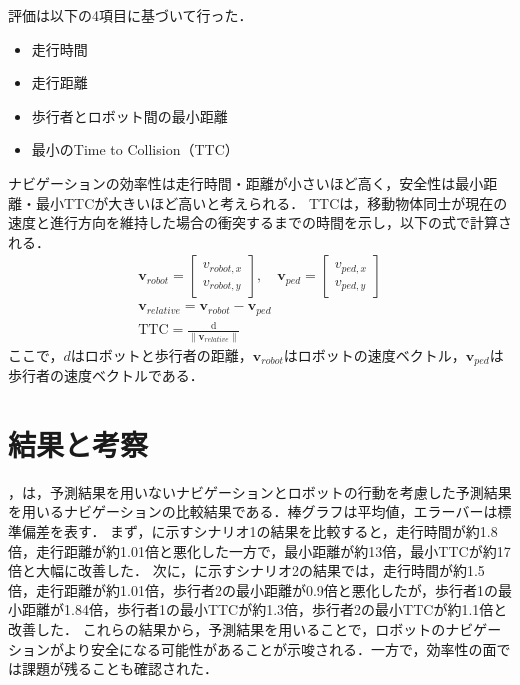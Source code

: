 評価は以下の4項目に基づいて行った．
\begin{itemize}
  \item 走行時間
  \item 走行距離
  \item 歩行者とロボット間の最小距離
  \item 最小のTime to Collision（TTC）
\end{itemize}
ナビゲーションの効率性は走行時間・距離が小さいほど高く，安全性は最小距離・最小TTCが大きいほど高いと考えられる．
TTCは，移動物体同士が現在の速度と進行方向を維持した場合の衝突するまでの時間を示し，以下の式で計算される．
\setlength{\jot}{1em}
\begin{align}
  \mathbf{v}_{robot} = \begin{bmatrix} v_{robot,x} \\ v_{robot,y} \end{bmatrix}, \quad 
  \mathbf{v}_{ped} = \begin{bmatrix} v_{ped,x} \\ v_{ped,y} \end{bmatrix} \\
  \mathbf{v}_{relative} = \mathbf{v}_{robot} - \mathbf{v}_{ped} \\
  \text{TTC} = \frac{\text{d}}{\|\mathbf{v}_{relative}\|}
\end{align}
ここで，$d$はロボットと歩行者の距離，$\mathbf{v}_{robot}$はロボットの速度ベクトル，$\mathbf{v}_{ped}$は歩行者の速度ベクトルである．

\section{結果と考察}\label{sec:exp-sim-result}
，は，予測結果を用いないナビゲーションとロボットの行動を考慮した予測結果を用いるナビゲーションの比較結果である．棒グラフは平均値，エラーバーは標準偏差を表す．
まず，に示すシナリオ1の結果を比較すると，走行時間が約1.8倍，走行距離が約1.01倍と悪化した一方で，最小距離が約13倍，最小TTCが約17倍と大幅に改善した．
次に，に示すシナリオ2の結果では，走行時間が約1.5倍，走行距離が約1.01倍，歩行者2の最小距離が0.9倍と悪化したが，歩行者1の最小距離が1.84倍，歩行者1の最小TTCが約1.3倍，歩行者2の最小TTCが約1.1倍と改善した．
これらの結果から，予測結果を用いることで，ロボットのナビゲーションがより安全になる可能性があることが示唆される．一方で，効率性の面では課題が残ることも確認された．

